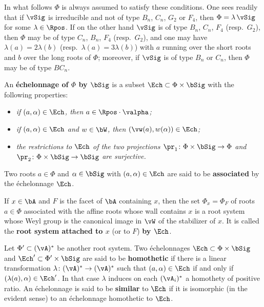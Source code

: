 \documentclass[12pt,a4paper,oneside,english]{smfart}
\makeatletter
\newcommand{\btanchor}[1]{\leavevmode\Hy@raisedlink{\hypertarget{bt:#1}{}}}
\theoremstyle{definition}
\theoremstyle{bt}
\makeatother
\begin{document}
\smallskip
In what follows $\Phi$ is always assumed to satisfy these conditions.  One sees readily that if $\vSig$ is irreducible and not of type $B_n$, $C_n$, $G_2$ or $F_4$, then $\Phi=\lambda\,\vSig$ for some $\lambda\in\Rpos$.  If on the other hand $\vSig$ is of type $B_n$, $C_n$, $F_4$ (resp.\ $G_2$), then $\Phi$ may be of type $C_n$, $B_n$, $F_4$ (resp.\ $G_2$), and one may have $\lambda(a)=2\lambda(b)$ (resp.\ $\lambda(a)=3\lambda(b)$) with $a$ running over the short roots and $b$ over the long roots of $\Phi$; moreover, if $\vSig$ is of type $B_n$ or $C_n$, then $\Phi$ may be of type $BC_n$.

\medskip
An \textbf{\'echelonnage of $\Phi$ by $\bSig$} is a subset $\Ech\subset\Phi\times\bSig$ with the following properties:

\begin{itemize}[leftmargin=3.2em,itemsep=.3em]
\item[(E\,1)] \textit{if $(a,\alpha)\in\Ech$, then $a\in\Rpos\cdot\valpha$;}
\item[(E\,2)] \textit{if $(a,\alpha)\in\Ech$ and $w\in\bW$, then
      $(\vw(a),w(\alpha))\in\Ech$;}
\item[(E\,3)] \textit{the restrictions to $\Ech$ of the two projections
      $\pr_1\colon\Phi\times\bSig\to\Phi$ and       $\pr_2\colon\Phi\times\bSig\to\bSig$ are surjective.}
\end{itemize}

\smallskip
Two roots $a\in\Phi$ and $\alpha\in\bSig$ with $(a,\alpha)\in\Ech$ are said to be \textbf{associated} by the \'echelonnage $\Ech$.

\btanchor{1.4.2}
If $x\in\bA$ and $F$ is the facet of $\bA$ containing $x$, then the set $\Phi_x=\Phi_F$ of roots $a\in\Phi$ associated with the affine roots whose wall contains $x$ is a root system whose Weyl group is the canonical image in $\vW$ of the stabilizer of $x$.  It is called the \textbf{root system attached to $x$} (or to $F$) \textbf{by $\Ech$}.

\btanchor{1.4.3}
Let $\Phi'\subset(\vA)^{*}$ be another root system.  Two \'echelonnages $\Ech\subset\Phi\times\bSig$ and $\Ech'\subset\Phi'\times\bSig$ are said to be
\textbf{homothetic} if there is a linear transformation
$\lambda\colon(\vA)^{*}\to(\vA)^{*}$ such that $(a,\alpha)\in\Ech$ if and only if $(\lambda(a),\alpha)\in\Ech'$.  In that case $\lambda$ induces on each $(\vA_i)^{*}$ a homothety of positive ratio.  An \'echelonnage is said to be
\textbf{similar} to $\Ech$ if it is isomorphic (in the evident sense) to an
\'echelonnage homothetic to $\Ech$.
\end{document}
